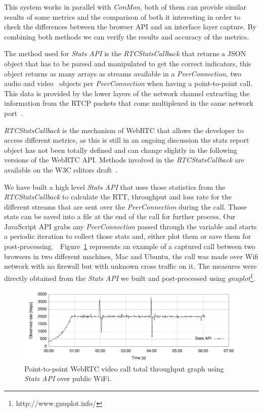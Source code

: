 This system works in parallel with {\it ConMon}, both of them can provide similar results of some metrics and the comparison of both it interesting in order to check the differences between the browser API and an interface layer capture. By combining both methods we can verify the results and accuracy of the metrics.

The method used for {\it Stats API} is the {\it RTCStatsCallback} that returns a JSON object that has to be parsed and manipulated to get the correct indicators, this object returns as many arrays as streams available in a {\it PeerConnection}, two audio and video~\cite{editorWebRTCdraft} objects per {\it PeerConnection} when having a point-to-point call. This data is provided by the lower layers of the network channel extracting the information from the RTCP packets that come multiplexed in the same network port~\cite{rtpusageIETF}.

{\it RTCStatsCallback} is the mechanism of WebRTC that allows the developer to access different metrics, as this is still in an ongoing discussion the stats report object has not been totally defined and can change slightly in the following versions of the WebRTC API. Methods involved in the {\it RTCStatsCallback} are available on the W3C editors draft~\cite{editorWebRTCdraft}. 

We have built a high level {\it Stats API} that uses those statistics from the {\it RTCStatsCallback} to calculate the RTT, throughput and loss rate for the different streams that are sent over the {\it PeerConnection} during the call. Those stats can be saved into a file at the end of the call for further process. Our JavaScript API grabs any {\it PeerConnection} passed through the variable and starts a periodic iteration to collect those stats and, either plot them or save them for post-processing. 

Figure~\ref{fig:onetooneWifiRTC} represents an example of a captured call between two browsers in two different machines, Mac and Ubuntu, the call was made over Wifi network with no firewall but with unknown cross traffic on it. The measures were directly obtained from the {\it Stats API} we built and post-processed using {\it gnuplot}\footnote{http://www.gnuplot.info/}.

 \begin{figure}[h]
  \centering
    \includegraphics[width=1\textwidth]{./figures/onetooneWifiStatsRTC.pdf}
      \caption[Point-to-point WebRTC video call total throughput graph using {\it Stats API} over public WiFi]{Point-to-point WebRTC video call total throughput graph using {\it Stats API} over public WiFi.}
	\label{fig:onetooneWifiRTC}
\end{figure}


